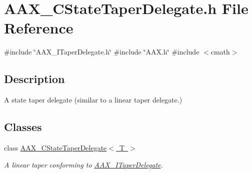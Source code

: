\hypertarget{a00473}{}\section{A\+A\+X\+\_\+\+C\+State\+Taper\+Delegate.\+h File Reference}
\label{a00473}
{\ttfamily \#include \char`\"{}A\+A\+X\+\_\+\+I\+Taper\+Delegate.\+h\char`\"{}}\newline
{\ttfamily \#include \char`\"{}A\+A\+X.\+h\char`\"{}}\newline
{\ttfamily \#include $<$cmath$>$}\newline


\subsection{Description}
A state taper delegate (similar to a linear taper delegate.) 

\subsection*{Classes}
\begin{DoxyCompactItemize}
\item 
class \mbox{\hyperlink{a01569}{A\+A\+X\+\_\+\+C\+State\+Taper\+Delegate$<$ T $>$}}
\begin{DoxyCompactList}\small\item\em A linear taper conforming to \mbox{\hyperlink{a01881}{A\+A\+X\+\_\+\+I\+Taper\+Delegate}}. \end{DoxyCompactList}\end{DoxyCompactItemize}
